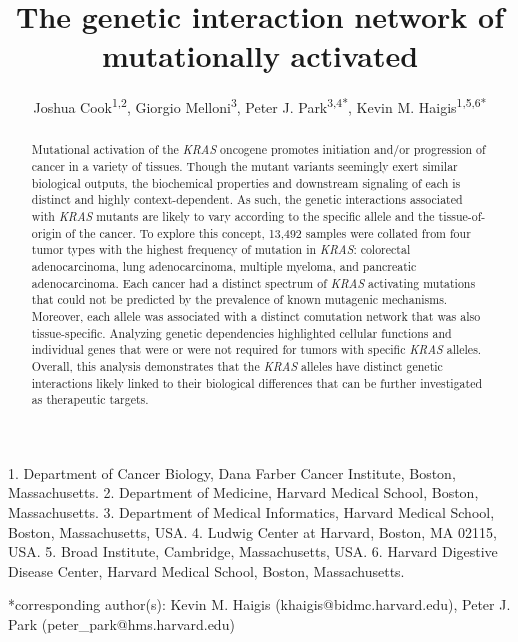 \documentclass[english, 10pt, letterpaper]{article}
\title{The genetic interaction network of mutationally activated \KRAS{}}
\author{
    Joshua Cook\textsuperscript{1,2},
    Giorgio Melloni\textsuperscript{3}, 
    Peter J. Park\textsuperscript{3,4{*}}, 
    Kevin M. Haigis\textsuperscript{1,5,6{*}}
}
\newcommand{\KRAS}{\emph{KRAS}}
\begin{document}
\maketitle

\thispagestyle{fancy}

1. Department of Cancer Biology, Dana Farber Cancer Institute, Boston, Massachusetts.
2. Department of Medicine, Harvard Medical School, Boston, Massachusetts.
3. Department of Medical Informatics, Harvard Medical School, Boston, Massachusetts, USA.
4. Ludwig Center at Harvard, Boston, MA 02115, USA.
5. Broad Institute, Cambridge, Massachusetts, USA.
6. Harvard Digestive Disease Center, Harvard Medical School, Boston, Massachusetts.

{*}corresponding author(s): Kevin M. Haigis (khaigis@bidmc.harvard.edu), Peter J. Park (peter\_park@hms.harvard.edu)

\begin{abstract}
Mutational activation of the \KRAS{} oncogene promotes initiation and/or progression of cancer in a variety of tissues.
Though the mutant variants seemingly exert similar biological outputs, the biochemical properties and downstream signaling  of each is distinct and highly context-dependent.
As such, the genetic interactions associated with \KRAS{} mutants are likely to vary according to the specific allele and the tissue-of-origin of the cancer.
To explore this concept, 13,492 samples were collated from four tumor types with the highest frequency of mutation in \KRAS{}: colorectal adenocarcinoma, lung adenocarcinoma, multiple myeloma, and pancreatic adenocarcinoma.
Each cancer had a distinct spectrum of \KRAS{} activating mutations that could not be predicted by the prevalence of known mutagenic mechanisms.
Moreover, each allele was associated with a distinct comutation network that was also tissue-specific.
Analyzing genetic dependencies highlighted cellular functions and individual genes that were or were not required for tumors with specific \KRAS{} alleles.
Overall, this analysis demonstrates that the \KRAS{} alleles have distinct genetic interactions likely linked to their biological differences that can be further investigated as therapeutic targets.
\end{abstract}



\section*{}
\end{document}
